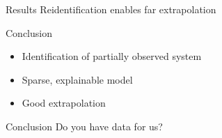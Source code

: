 \documentclass{beamer}
\begin{document}
\begin{frame}{Results}
  \centering
  \resizebox{\linewidth}{!}{}
  \color{black}
  \alert{Reidentification} enables far extrapolation
\end{frame}

\begin{frame}[label=conclusion, standout]{Conclusion}
  \begin{itemize}
    \item Identification of partially observed system
    \item<2-> Sparse, explainable model
    \item<3-> Good extrapolation
  \end{itemize}
\end{frame}

\begin{frame}[standout]{Conclusion}
  \centering
  Do you have data for us?
\end{frame}
\end{document}

